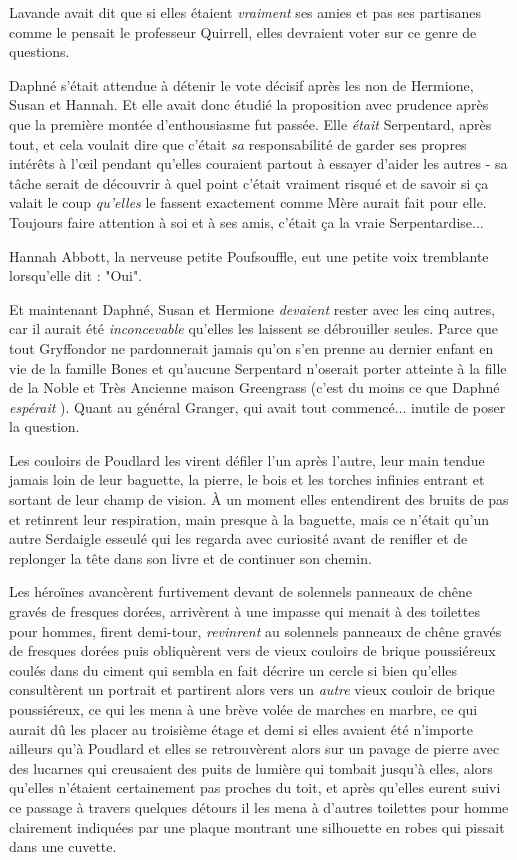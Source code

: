Lavande avait dit que si elles étaient \emph{vraiment}  ses amies et pas ses partisanes comme le pensait le professeur Quirrell, elles devraient voter sur ce genre de questions.

Daphné s'était attendue à détenir le vote décisif après les non de Hermione, Susan et Hannah. Et elle avait donc étudié la proposition avec prudence après que la première montée d'enthousiasme fut passée. Elle \emph{était}  Serpentard, après tout, et cela voulait dire que c'était \emph{sa}  responsabilité de garder ses propres intérêts à l'œil pendant qu'elles couraient partout à essayer d'aider les autres - sa tâche serait de découvrir à quel point c'était vraiment risqué et de savoir si ça valait le coup \emph{qu'elles}  le fassent exactement comme Mère aurait fait pour elle. Toujours faire attention à soi et à ses amis, c'était ça la vraie Serpentardise...

Hannah Abbott, la nerveuse petite Poufsouffle, eut une petite voix tremblante lorsqu'elle dit : "Oui".

Et maintenant Daphné, Susan et Hermione \emph{devaient}  rester avec les cinq autres, car il aurait été \emph{inconcevable}  qu'elles les laissent se débrouiller seules. Parce que tout Gryffondor ne pardonnerait jamais qu'on s'en prenne au dernier enfant en vie de la famille Bones et qu'aucune Serpentard n'oserait porter atteinte à la fille de la Noble et Très Ancienne maison Greengrass (c'est du moins ce que Daphné \emph{espérait} ). Quant au général Granger, qui avait tout commencé... inutile de poser la question.

Les couloirs de Poudlard les virent défiler l'un après l'autre, leur main tendue jamais loin de leur baguette, la pierre, le bois et les torches infinies entrant et sortant de leur champ de vision. À un moment elles entendirent des bruits de pas et retinrent leur respiration, main presque à la baguette, mais ce n'était qu'un autre Serdaigle esseulé qui les regarda avec curiosité avant de renifler et de replonger la tête dans son livre et de continuer son chemin.

Les héroïnes avancèrent furtivement devant de solennels panneaux de chêne gravés de fresques dorées, arrivèrent à une impasse qui menait à des toilettes pour hommes, firent demi-tour, \emph{revinrent}  au solennels panneaux de chêne gravés de fresques dorées puis obliquèrent vers de vieux couloirs de brique poussiéreux coulés dans du ciment qui sembla en fait décrire un cercle si bien qu'elles consultèrent un portrait et partirent alors vers un \emph{autre}  vieux couloir de brique poussiéreux, ce qui les mena à une brève volée de marches en marbre, ce qui aurait dû les placer au troisième étage et demi si elles avaient été n'importe ailleurs qu'à Poudlard et elles se retrouvèrent alors sur un pavage de pierre avec des lucarnes qui creusaient des puits de lumière qui tombait jusqu'à elles, alors qu'elles n'étaient certainement pas proches du toit, et après qu'elles eurent suivi ce passage à travers quelques détours il les mena à d'autres toilettes pour homme clairement indiquées par une plaque montrant une silhouette en robes qui pissait dans une cuvette.

